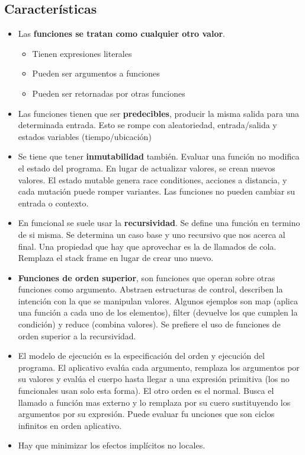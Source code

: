 \subsection*{Características}

\begin{itemize}
\item Las \textbf{funciones se tratan como cualquier otro valor}. 
\begin{itemize}
    \item Tienen expresiones literales
    \item Pueden ser argumentos a funciones
    \item Pueden ser retornadas por otras funciones
\end{itemize}
\item Las funciones tienen que ser \textbf{predecibles}, producir la misma salida para una determinada entrada. Esto se rompe con aleatoriedad, entrada/salida y estados variables (tiempo/ubicación)
\item Se tiene que tener \textbf{inmutabilidad} también. Evaluar una función no modifica el estado del programa. En lugar de actualizar valores, se crean nuevos valores. El estado mutable genera race conditiones, acciones a distancia, y cada mutación puede romper variantes. Las funciones no pueden cambiar su entrada o contexto.
\item En funcional se suele usar la \textbf{recursividad}. Se define una función en termino de si misma. Se determina un caso base y uno recursivo que nos acerca al final. Una propiedad que hay que aprovechar es la de llamados de cola. Remplaza el stack frame en lugar de crear uno nuevo. 
\item \textbf{Funciones de orden superior}, son funciones que operan sobre otras funciones como argumento. Abstraen estructuras de control, describen la intención con la que se manipulan valores. Algunos ejemplos son map (aplica una función a cada uno de los elementos), filter (devuelve los que cumplen la condición) y reduce (combina valores). Se prefiere el uso de funciones de orden superior a la recursividad.
\item El modelo de ejecución es la especificación del orden y ejecución del programa. El aplicativo evalúa cada argumento, remplaza los argumentos por su valores y evalúa el cuerpo hasta llegar a una expresión primitiva (los no funcionales usan solo esta forma). El otro orden es el normal. Busca el llamado a función mas externo y lo remplaza por su cuero sustituyendo los argumentos por su expresión. Puede evaluar fu unciones que son ciclos infinitos en orden aplicativo.
\item Hay que minimizar los efectos implícitos no locales.
\end{itemize}




